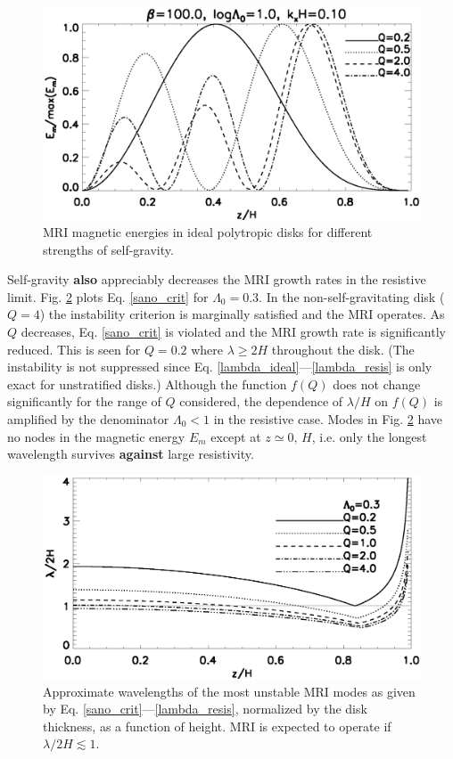 \begin{figure}
  \includegraphics[width=\linewidth]{figures/compare_result_lambda10}
  \caption{MRI magnetic energies in ideal polytropic disks
    for different strengths of self-gravity.    
    \label{compare_result_lambda10}}
\end{figure}

Self-gravity {\bf also} appreciably decreases the MRI growth rates in the
resistive limit. Fig. \ref{lambda_poly_resis} plots 
Eq. \ref{sano_crit} for $\Lambda_0=0.3$. In the non-self-gravitating
disk ($Q=4$) the instability criterion is marginally satisfied and the
MRI operates. As $Q$ decreases, 
Eq. \ref{sano_crit} is violated and the MRI growth rate is
significantly reduced. This is seen for $Q=0.2$ where $\lambda \geq 2H$ throughout
the disk. (The instability is not suppressed since
Eq. \ref{lambda_ideal}---\ref{lambda_resis} is only exact for
unstratified disks.) Although the function 
$f(Q)$ does not change significantly for the range of $Q$ considered,
the dependence of {\bf $\lambda/H$} on $f(Q)$ is amplified by the
denominator $\Lambda_0<1$ in the resistive case. Modes in
Fig. \ref{lambda_poly_resis} have no nodes in the magnetic energy
$E_m$ except at $z\simeq0,\,H$, i.e. only the longest wavelength survives
{\bf against} large resistivity. 

\begin{figure}
  \includegraphics[width=\linewidth]{figures/lambda_poly_uniresis}
  \caption{Approximate wavelengths of the most unstable MRI modes as given by
    Eq. \ref{sano_crit}---\ref{lambda_resis}, normalized by the 
    disk thickness, as a function of height. MRI is expected to
    operate if $\lambda/2H\lesssim 1$. 
    \label{lambda_poly_resis}}
\end{figure}



